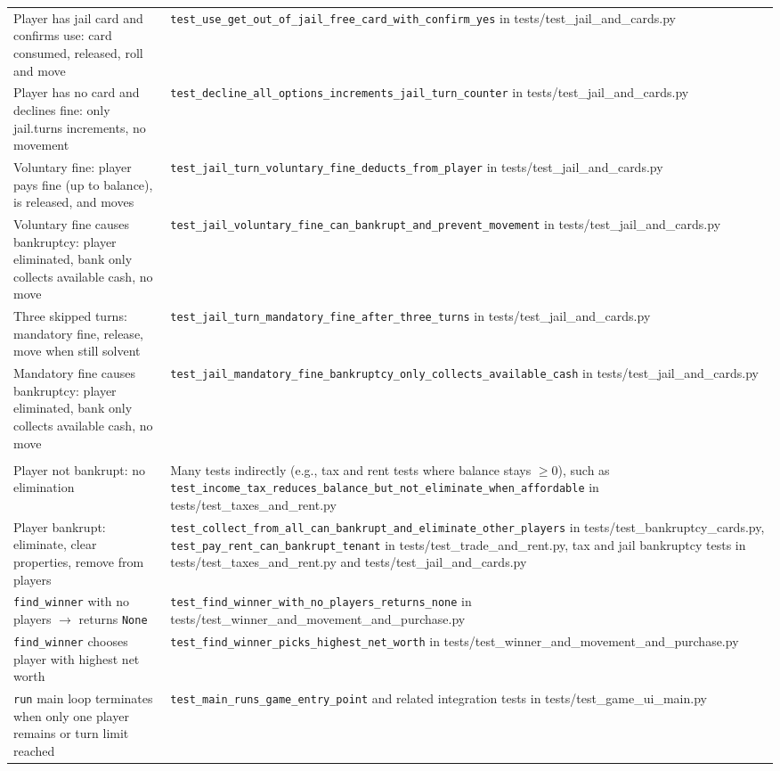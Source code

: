 \documentclass[11pt]{article}
\begin{document}
\begin{longtable}{>{\raggedright\arraybackslash}p{} >{\raggedright\arraybackslash}p{}}
\multicolumn{2}{l}{\textbf{moneypoly.game: \_handle\_jail\_turn}} \\ \hline
Player has jail card and confirms use: card consumed, released, roll and move & \texttt{test\_use\_get\_out\_of\_jail\_free\_card\_with\_confirm\_yes} in tests/test\_jail\_and\_cards.py \\ \hline
Player has no card and declines fine: only jail.turns increments, no movement & \texttt{test\_decline\_all\_options\_increments\_jail\_turn\_counter} in tests/test\_jail\_and\_cards.py \\ \hline
Voluntary fine: player pays fine (up to balance), is released, and moves & \texttt{test\_jail\_turn\_voluntary\_fine\_deducts\_from\_player} in tests/test\_jail\_and\_cards.py \\ \hline
Voluntary fine causes bankruptcy: player eliminated, bank only collects available cash, no move & \texttt{test\_jail\_voluntary\_fine\_can\_bankrupt\_and\_prevent\_movement} in tests/test\_jail\_and\_cards.py \\ \hline
Three skipped turns: mandatory fine, release, move when still solvent & \texttt{test\_jail\_turn\_mandatory\_fine\_after\_three\_turns} in tests/test\_jail\_and\_cards.py \\ \hline
Mandatory fine causes bankruptcy: player eliminated, bank only collects available cash, no move & \texttt{test\_jail\_mandatory\_fine\_bankruptcy\_only\_collects\_available\_cash} in tests/test\_jail\_and\_cards.py \\ \hline

\multicolumn{2}{l}{\textbf{moneypoly.game: \_check\_bankruptcy / check\_bankruptcy and winner/run}} \\ \hline
Player not bankrupt: no elimination & Many tests indirectly (e.g., tax and rent tests where balance stays $\geq 0$), such as \texttt{test\_income\_tax\_reduces\_balance\_but\_not\_eliminate\_when\_affordable} in tests/test\_taxes\_and\_rent.py \\ \hline
Player bankrupt: eliminate, clear properties, remove from players & \texttt{test\_collect\_from\_all\_can\_bankrupt\_and\_eliminate\_other\_players} in tests/test\_bankruptcy\_cards.py, \texttt{test\_pay\_rent\_can\_bankrupt\_tenant} in tests/test\_trade\_and\_rent.py, tax and jail bankruptcy tests in tests/test\_taxes\_and\_rent.py and tests/test\_jail\_and\_cards.py \\ \hline
\texttt{find\_winner} with no players $\rightarrow$ returns \texttt{None} & \texttt{test\_find\_winner\_with\_no\_players\_returns\_none} in tests/test\_winner\_and\_movement\_and\_purchase.py \\ \hline
\texttt{find\_winner} chooses player with highest net worth & \texttt{test\_find\_winner\_picks\_highest\_net\_worth} in tests/test\_winner\_and\_movement\_and\_purchase.py \\ \hline
\texttt{run} main loop terminates when only one player remains or turn limit reached & \texttt{test\_main\_runs\_game\_entry\_point} and related integration tests in tests/test\_game\_ui\_main.py \\ \hline


\end{longtable}
\end{document}
